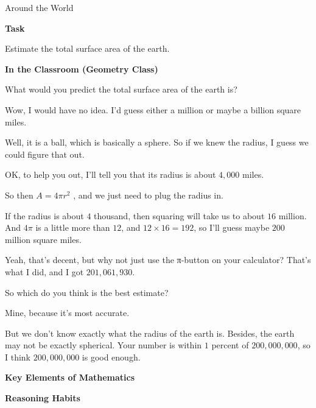 \TriExample
  {Around the World}
  {
    \textbf{Task}

    Estimate the total surface area of the earth.

    \textbf{In the Classroom (Geometry Class)}

    \begin{scriptlist}
      \item [Teacher:] What would you predict the total surface area of the earth is?

      \item [Student 1:] Wow, I would have no idea. I'd guess either a million or maybe a billion square miles.

      \item [Student 2:] Well, it is a ball, which is basically a sphere. So if we knew the radius, I guess we could figure that out.

      \item [Teacher:] OK, to help you out, I'll tell you that its radius is about $4,000$ miles.

      \item [Student 2:] So then $A = 4\pi r^2$ , and we just need to plug the radius in.

      \item [Student 3:] If the radius is about $4$ thousand, then squaring will take us to about $16$ million. And $4\pi$ is a little more than $12$, and $12 \times 16 = 192$, so I'll guess maybe $200$ million square miles.

      \item [Student 4:] Yeah, that's decent, but why not just use the π-button on your calculator? That's what I did, and I got $201,061,930$.

      \item [Teacher:] So which do you think is the best estimate?

      \item [Student 4:] Mine, because it's most accurate.

      \item [Student 3:] But we don't know exactly what the radius of the earth is. Besides, the earth may not be exactly spherical. Your number is within $1$ percent of $200,000,000$, so I think $200,000,000$ is good enough.
    \end{scriptlist}\vspace{\baselineskip}

    \textbf{Key Elements of Mathematics}

    \begin{hanglist}
    \end{hanglist}

    \textbf{Reasoning Habits}

    \begin{hanglist}

    \end{hanglist}
  }

